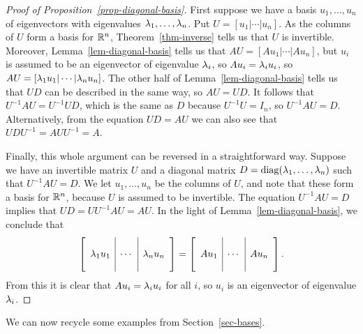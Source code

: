 \documentclass[reqno]{amsart}
\theoremstyle{definition}
\begin{document}
\begin{proof}[Proof of Proposition~\ref{prop-diagonal-basis}]
 First suppose we have a basis $u_1,\dotsc,u_n$ of eigenvectors with
 eigenvalues $\lambda_1,\dotsc,\lambda_n$.  Put $U=[u_1|\cdots|u_n]$.  As the
 columns of $U$ form a basis for ${\mathbb{R}}^n$, Theorem~\ref{thm-inverse}
 tells us that $U$ is invertible.  Moreover,
 Lemma~\ref{lem-diagonal-basis} tells us that $AU=[Au_1|\cdots|Au_n]$,
 but $u_i$ is assumed to be an eigenvector of eigenvalue $\lambda_i$, so
 $Au_i=\lambda_iu_i$, so $AU=[\lambda_1u_1|\cdots|\lambda_nu_n]$.  The other half
 of Lemma~\ref{lem-diagonal-basis} tells us that $UD$ can be described
 in the same way, so $AU=UD$.  It follows that $U^{-1}AU=U^{-1}UD$,
 which is the same as $D$ because $U^{-1}U=I_n$, so $U^{-1}AU=D$.
 Alternatively, from the equation $UD=AU$ we can also see that
 $UDU^{-1}=AUU^{-1}=A$. 

 Finally, this whole argument can be reversed in a straightforward
 way.  Suppose we have an invertible matrix $U$ and a diagonal matrix
 $D=\operatorname{diag}(\lambda_1,\dotsc,\lambda_n)$ such that $U^{-1}AU=D$.  We let
 $u_1,\dotsc,u_n$ be the columns of $U$, and note that these form a
 basis for ${\mathbb{R}}^n$, because $U$ is assumed to be invertible.  The
 equation $U^{-1}AU=D$ implies that $UD=UU^{-1}AU=AU$.  In the light
 of Lemma~\ref{lem-diagonal-basis}, we conclude that
 \[ 
  \left[\begin{array}{c|c|c}
   && \\ \lambda_1u_1 & \cdots & \lambda_nu_n \\ &&
  \end{array}\right]
  = 
  \left[\begin{array}{c|c|c}
   && \\ Au_1 & \cdots & Au_n \\ &&
  \end{array}\right].
 \]
 From this it is clear that $Au_i=\lambda_iu_i$ for all $i$, so $u_i$ is
 an eigenvector of eigenvalue $\lambda_i$.
\end{proof}

We can now recycle some examples from Section~\ref{sec-bases}.
\end{document}
